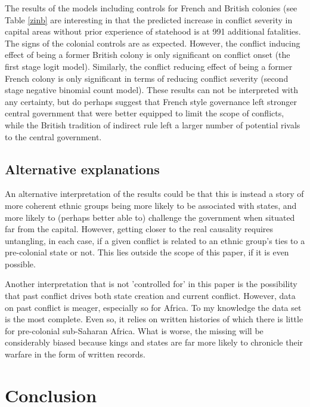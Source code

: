 \documentclass[12pt]{article}
\begin{document}

The results of the models including controls for French and British colonies
(see Table \ref{zinb} are interesting in that the predicted increase in conflict
severity in capital areas without prior experience of statehood is at 991
additional fatalities. The signs of the colonial controls are as
expected. However, the conflict inducing effect of being a former British
colony is only significant on conflict onset (the first stage logit
model). Similarly, the conflict reducing effect of being a former French colony
is only significant in terms of reducing conflict severity (second stage
negative binomial count model). These results can not be interpreted with any
certainty, but do perhaps suggest that French style governance left stronger
central government that were better equipped to limit the scope of conflicts,
while the British tradition of indirect rule left a larger number of potential
rivals to the central government.

\subsection{Alternative explanations}

An alternative interpretation of the results could be that this is instead a
story of more coherent ethnic groups being more likely to be associated with
states, and more likely to (perhaps better able to) challenge the government
when situated far from the capital. However, getting closer to the real
causality requires untangling, in each case, if a given conflict is related to
an ethnic group's ties to a pre-colonial state or not. This lies outside the
scope of this paper, if it is even possible.

Another interpretation that is not 'controlled for' in this paper is the
possibility that past conflict drives both state creation and current conflict.
However, data on past conflict is meager, especially so for Africa. To my
knowledge the \citet{Brecke1999} data set is the most complete. Even so, it
relies on written histories of which there is little for pre-colonial
sub-Saharan Africa. What is worse, the missing will be considerably biased
because kings and states are far more likely to chronicle their warfare in the
form of written records.

\section{Conclusion}
\end{document}
